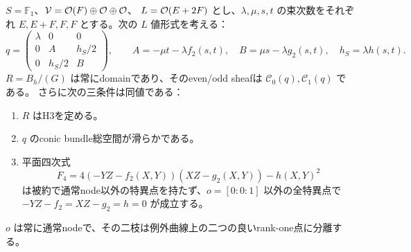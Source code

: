 \begin{theorem}
\label{thm:h3-order2-22-clifford-conic}
$S=\mathbb F_1$、$\mathcal V=\mathcal O(F)\oplus\mathcal O\oplus\mathcal O$、
$L=\mathcal O(E+2F)$ とし、$\lambda,\mu,s,t$ の束次数をそれぞれ
$E,E+F,F,F$ とする。次の $L$ 値形式を考える：
\[
 q=\begin{pmatrix}\lambda&0&0\\0&A&h_S/2\\0&h_S/2&B\end{pmatrix},\qquad
 A=-\mu t-\lambda f_2(s,t),\quad B=\mu s-\lambda g_2(s,t),\quad
 h_S=\lambda h(s,t).
\]
$R=B_h/(G)$ は常にdomainであり、そのeven/odd sheafは
$\mathcal C_0(q),\mathcal C_1(q)$ である。
さらに次の三条件は同値である：
\begin{enumerate}
\item $R$ はH3を定める。
\item $q$ のconic bundle総空間が滑らかである。
\item 平面四次式
\[
 F_4=4(-YZ-f_2(X,Y))(XZ-g_2(X,Y))-h(X,Y)^2
\]
は被約で通常node以外の特異点を持たず、$o=[0:0:1]$ 以外の全特異点で
$-YZ-f_2=XZ-g_2=h=0$ が成立する。
\end{enumerate}
$o$ は常に通常nodeで、その二枝は例外曲線上の二つの良いrank-one点に分離する。
\end{theorem}
